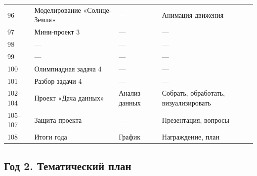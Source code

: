 \documentclass[12pt,a4paper]{article}
\newcommand{\ml}[1]{\textcolor{blue!65!black}{\small #1}}
\begin{document}
\begin{longtable}{C{0.9cm}L{4.3cm}L{4.1cm}L{4.5cm}}
96 & Моделирование «Солнце-Земля» & --- & \ml{Анимация движения}\\
97 & Мини-проект 3 & --- & ---\\
98 & --- & --- & ---\\
99 & --- & --- & ---\\
100 & Олимпиадная задача 4 & --- & ---\\
101 & Разбор задачи 4 & --- & ---\\
102--104 & Проект «Дача данных» & Анализ данных & \ml{Собрать, обработать, визуализировать}\\
105--107 & Защита проекта & --- & Презентация, вопросы\\
108 & Итоги года & График & Награждение, план\\
\bottomrule
\end{longtable}

\subsection{Год 2. Тематический план}
\end{document}
